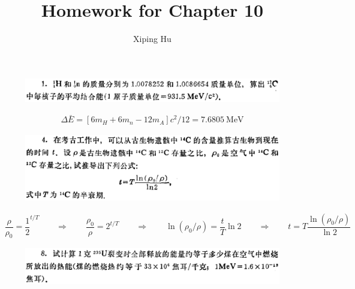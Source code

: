 \documentclass{article}
\author{Xiping Hu}
\affil{https://hxp.plus/}
\title{Homework for Chapter 10}
\newcommand{\si}[1]{\  \mathrm{#1}}
\begin{document}
\maketitle

\begin{figure}[H]
  \centering
  \includegraphics[width=\linewidth]{figures/Problem1}
  \label{fig:}
\end{figure}

\begin{equation*}
  \begin{aligned}
    \Delta \bar{E} = \left[ 6 m_H + 6 m_n - 12 m_A \right] c^2 / 12 = 7.6805 \si{MeV}
   \end{aligned}
\end{equation*}

\begin{figure}[H]
  \centering
  \includegraphics[width=\linewidth]{figures/Problem4}
  \label{fig:}
\end{figure}

\begin{equation*}
  \begin{aligned}
    \dfrac{\rho}{\rho_0} = \dfrac{1}{2}^{t/T} \quad\quad \Rightarrow \quad\quad
    \dfrac{\rho_0}{\rho} = 2^{t/T} \quad\quad \Rightarrow \quad\quad
    \ln \left( \rho_0 / \rho \right) = \dfrac{t}{T} \ln 2 \quad\quad \Rightarrow \quad\quad
    t = T \dfrac{\ln \left( \rho_0 / \rho \right)}{\ln 2} 
  \end{aligned}
\end{equation*}

\begin{figure}[H]
  \centering
  \includegraphics[width=\linewidth]{figures/Problem8}
  \label{fig:}
\end{figure}
\end{document}
